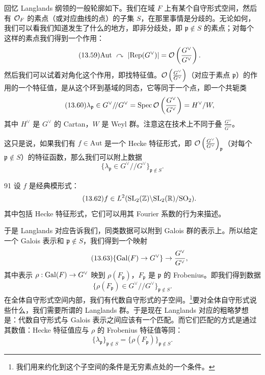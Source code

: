 回忆 Langlands 纲领的一般轮廓如下。我们在域 $F$ 上有某个自守形式空间，然后有 $\mathcal{O}_F$ 的素点（或对应曲线的点）的子集 $S$，在那里事情是分歧的。无论如何，我们可以看我们知道发生了什么的地方，即非分歧处，即 $\mathfrak p\notin S$ 的素点；对每个这样的素点我们得到一个作用：
\begin{equation}\tag{13.59}
\mathrm{Aut}\ \curvearrowright\ |\Rep(G^\vee)|=\cO\left(\frac{G^\vee}{G^\vee}\right).
\end{equation}
然后我们可以试着对角化这个作用，即找特征值。$\mathcal{O}\left(\frac{G^\vee}{G^\vee}\right)$（对应于素点 $\mathfrak p$）的作用的一个特征值，是从这个环到基域的同态，它等同于一个点，即一个共轭类
\begin{equation}\tag{13.60}
\lambda_{\mathfrak p}\in G^\vee/\!/G^\vee=\mathrm{Spec}\,\mathcal{O}\left(\frac{G^\vee}{G^\vee}\right)=H^\vee/W,
\end{equation}
其中 $H^\vee$ 是 $G^\vee$ 的 Cartan，$W$ 是 Weyl 群。注意这在技术上不同于叠 $\frac{G^\vee}{G^\vee}$。

这只是说，如果我们有 $f\in\mathrm{Aut}$ 是一个 Hecke 特征形式，即 $\mathcal{O}\left(\frac{G^\vee}{G^\vee}\right)_{\mathfrak p}$（对每个 $\mathfrak p\notin S$）的特征函数，那么我们可以附上数据
\begin{equation}\tag{13.61}
\{\lambda_{\mathfrak p}\in G^\vee/\!/G^\vee\}_{\mathfrak p\notin S}.
\end{equation}

\begin{srcex}{91}
设 $f$ 是经典模形式：
\begin{equation}\tag{13.62}
f\in L^2(\mathrm{SL}_2(\mathbb{Z})\backslash\mathrm{SL}_2(\mathbb{R})/\mathrm{SO}_2).
\end{equation}
其中包括 Hecke 特征形式，它们可以用其 Fourier 系数的行为来描述。
\end{srcex}

于是 Langlands 对应告诉我们，同类数据可以附到 Galois 群的表示上。所以给定一个 Galois 表示和 $\mathfrak p\notin S$，我们得到一个映射
\begin{equation}\tag{13.63}
\{\mathrm{Gal}(F)\to G^\vee\}\to \frac{G^\vee}{G^\vee},
\end{equation}
其中表示 $\rho:\mathrm{Gal}(F)\to G^\vee$ 映到 $\rho(F_{\mathfrak p})$，$F_{\mathfrak p}$ 是 $\mathfrak p$ 的 Frobenius。即我们得到数据
\begin{equation}\tag{13.64}
\{\rho(F_{\mathfrak p})\in G^\vee/\!/G^\vee\}_{\mathfrak p\notin S}.
\end{equation}
在全体自守形式空间内部，我们有代数自守形式的子空间。\footnote{我们用来约化到这个子空间的条件是无穷素点处的一个条件。}要对全体自守形式说些什么，我们需要所谓的 Langlands 群。于是现在 Langlands 对应的粗略梦想是：代数自守形式与 Galois 表示之间应该有一个匹配。而它们匹配的方式是通过其数值：Hecke 特征值应与 $\rho$ 的 Frobenius 特征值等同：
\begin{equation}\tag{13.65}
\{\lambda_{\mathfrak p}\}_{\mathfrak p\notin S}=\{\rho(F_{\mathfrak p})\}_{\mathfrak p\notin S}.
\end{equation}

